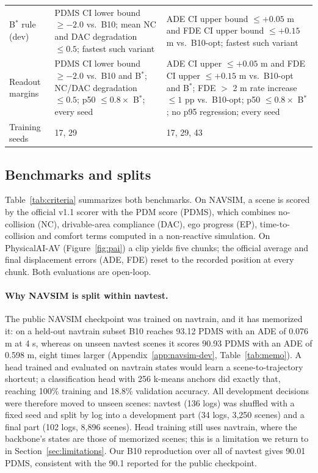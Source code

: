 \documentclass[10pt]{article}
\newcommand{\Bstar}{B$^{*}$}
\begin{document}
\begin{table}[t]
\begin{center}
\begin{tabular}{p{2.2cm}p{5.2cm}p{6.0cm}}
\Bstar{} rule (dev) & PDMS CI lower bound $\ge -2.0$ vs.\ B10; mean NC and DAC degradation $\le 0.5$; fastest such variant & ADE CI upper bound $\le +0.05$ m and FDE CI upper bound $\le +0.15$ m vs.\ B10-opt; fastest such variant \\
Readout margins & PDMS CI lower bound $\ge -2.0$ vs.\ B10 and \Bstar{}; NC/DAC degradation $\le 0.5$; p50 $\le 0.8 \times$ \Bstar{}; every seed & ADE CI upper $\le +0.05$ m and FDE CI upper $\le +0.15$ m vs.\ B10-opt and \Bstar{}; FDE $>$ 2 m rate increase $\le 1$ pp vs.\ B10-opt; p50 $\le 0.8 \times$ \Bstar{}; no p95 regression; every seed \\
Training seeds & 17, 29 & 17, 29, 43 \\
\bottomrule
\end{tabular}
\end{center}
\end{table}

\subsection{Benchmarks and splits}
\label{sec:benchmarks}

Table~\ref{tab:criteria} summarizes both benchmarks. On NAVSIM, a scene is scored by the official v1.1 scorer with the PDM score (PDMS), which combines no-collision (NC), drivable-area compliance (DAC), ego progress (EP), time-to-collision and comfort terms computed in a non-reactive simulation. On PhysicalAI-AV (Figure~\ref{fig:pai}) a clip yields five chunks; the official average and final displacement errors (ADE, FDE) reset to the recorded position at every chunk. Both evaluations are open-loop.

\paragraph{Why NAVSIM is split within navtest.} The public NAVSIM checkpoint was trained on navtrain, and it has memorized it: on a held-out navtrain subset B10 reaches 93.12 PDMS with an ADE of 0.076 m at 4 s, whereas on unseen navtest scenes it scores 90.93 PDMS with an ADE of 0.598 m, eight times larger (Appendix~\ref{app:navsim-dev}, Table~\ref{tab:memo}). A head trained and evaluated on navtrain states would learn a scene-to-trajectory shortcut; a classification head with 256 k-means anchors did exactly that, reaching 100\% training and 18.8\% validation accuracy. All development decisions were therefore moved to unseen scenes: navtest (136 logs) was shuffled with a fixed seed and split by log into a development part (34 logs, 3,250 scenes) and a final part (102 logs, 8,896 scenes). Head training still uses navtrain, where the backbone's states are those of memorized scenes; this is a limitation we return to in Section~\ref{sec:limitations}. Our B10 reproduction over all of navtest gives 90.01 PDMS, consistent with the 90.1 reported for the public checkpoint.
\end{document}
